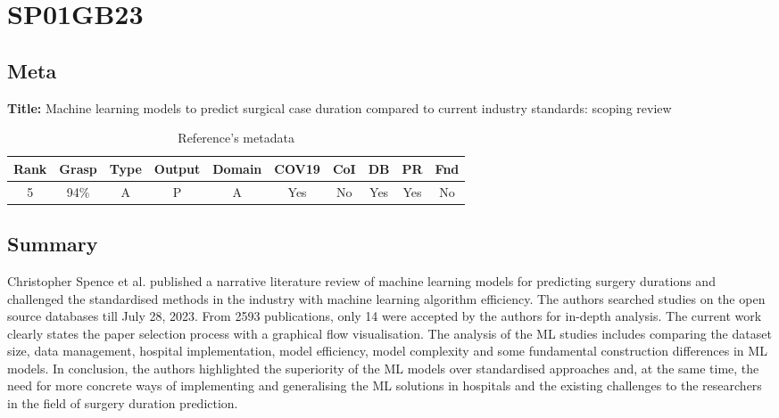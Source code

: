 \section{ SP01GB23 }


\subsection{Meta}

    \textbf{Title:}
    Machine learning models to predict surgical case duration compared to current industry standards: scoping review

    \begin{table}[H]
        \centering
        \begin{tabular}{|c|c|c|c|c|c|c|c|c|c|}
            \hline
                \textbf{Rank} & \textbf{Grasp} & \textbf{Type} & \textbf{Output} & \textbf{Domain} & \textbf{COV19} & \textbf{CoI} & \textbf{DB} & \textbf{PR} & \textbf{Fnd} \\
            \hline
                5 & 94\% & A & P & A & Yes & No & Yes & Yes & No \\
            \hline
        \end{tabular}
        \caption{Reference's metadata}
        \label{tab:SP01GB23}
    \end{table}

\subsection{Summary}
Christopher Spence et al. \cite{x084} published a narrative literature review of machine learning models for predicting surgery durations and challenged the standardised methods in the industry with machine learning algorithm efficiency. The authors searched studies on the open source databases till July 28, 2023. From 2593 publications, only 14 were accepted by the authors for in-depth analysis. The current work clearly states the paper selection process with a graphical flow visualisation. The analysis of the ML studies includes comparing the dataset size, data management, hospital implementation, model efficiency, model complexity and some fundamental construction differences in ML models. In conclusion, the authors highlighted the superiority of the ML models over standardised approaches and, at the same time, the need for more concrete ways of implementing and generalising the ML solutions in hospitals and the existing challenges to the researchers in the field of surgery duration prediction.
    

